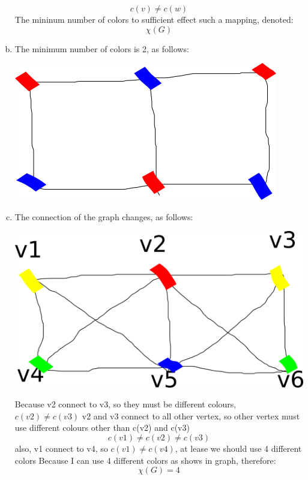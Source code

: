 \documentclass[11pt, a4paper]{article}
\begin{document}
\begin{enumerate}[(a)]
    $$ c(v) \ne c(w) $$
    The mininum number of colors to sufficient effect such a mapping, denoted:
    $$ \chi(G) $$
    \item
    The minimum number of colors is 2, as follows:\\
    \begin{center}
        \includegraphics[scale=0.7]{q1b1}
    \end{center}
    \item
    The connection of the graph changes, as follows:\\
    \begin{center}
        \includegraphics[scale=0.7]{q1c1}
    \end{center}
    Because v2 connect to v3, so they must be different colours, $c(v2) \ne c(v3)$
    v2 and v3 connect to all other vertex, so other vertex must use different colours other than c(v2) and c(v3)
    $$c(v1) \ne c(v2) \ne c(v3)$$
    also, v1 connect to v4, so $c(v1) \ne c(v4)$, at lease we should use 4 different colors
    Because I can use 4 different colors as shows in graph, therefore:
    $$ \chi(G) = 4 $$
\end{enumerate}
\end{document}
